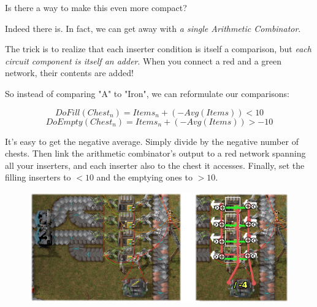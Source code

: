 \documentclass{article}
\begin{document}
Is there a way to make this even more compact?

Indeed there is. In fact, we can get away with \emph{a single Arithmetic Combinator}.

The trick is to realize that each inserter condition is itself a comparison, but \emph{each circuit component is itself an adder}. When you connect a red and a green network, their contents are added!

So instead of comparing "A" to "Iron", we can reformulate our comparisons:

$$DoFill(Chest_n) = Items_n + (-Avg(Items)) \lt 10$$
$$DoEmpty(Chest_n) = Items_n + (-Avg(Items)) \gt -10$$

It's easy to get the negative average. Simply divide by the negative number of chests. Then link the
arithmetic combinator's output to a red network spanning all your inserters, and each inserter also to the
chest it accesses. Finally, set the filling inserters to $<10$ and the emptying ones to $>10$.

\begin{figure}
\includegraphics{balancer.png}
\label{And that's how it works.}
\end{figure}
\end{document}
